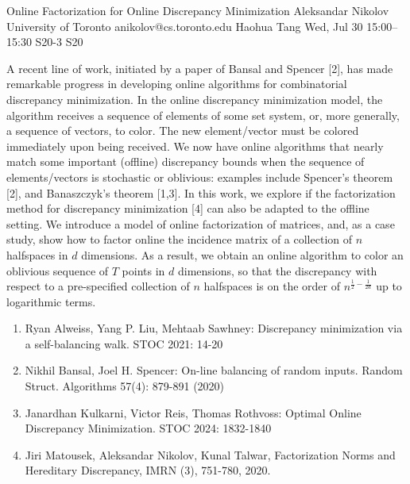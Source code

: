 \documentclass[12pt,lettersize,oneside]{book} %
\begin{document}
\begin{talk}
  {Online Factorization for Online Discrepancy Minimization}%
  {Aleksandar Nikolov}%
  {University of Toronto}%
  {anikolov@cs.toronto.edu}%
  {Haohua Tang}%
  {}%
  {Wed, Jul 30 15:00--15:30}%
  {S20-3}%
  {S20}%
  
    
   
A recent line of work, initiated by a paper of Bansal and Spencer [2], has made remarkable progress in developing online algorithms for combinatorial discrepancy minimization. In the online discrepancy minimization model, the algorithm receives a sequence of elements of some set system, or, more generally, a sequence of vectors, to color. The new element/vector must be colored immediately upon being received. We now have online algorithms that nearly match some important (offline) discrepancy bounds when the sequence of elements/vectors is stochastic or oblivious: examples include Spencer's theorem [2], and Banaszczyk's theorem [1,3]. In this work, we explore if the factorization method for discrepancy minimization [4] can also be adapted to the offline setting. We introduce a model of online factorization of matrices, and, as a case study, show how to factor online the incidence matrix of a collection of $n$ halfspaces in $d$ dimensions. As a result, we obtain an online algorithm to color an oblivious sequence of $T$ points in $d$ dimensions, so that the discrepancy with respect to a pre-specified collection of $n$ halfspaces is on the order of $n^{\frac12 - \frac{1}{2d}}$ up to logarithmic terms. 

\medskip

\begin{enumerate}
    \item[{[1]}] Ryan Alweiss, Yang P. Liu, Mehtaab Sawhney:
Discrepancy minimization via a self-balancing walk. STOC 2021: 14-20

 \item[{[2]}] Nikhil Bansal, Joel H. Spencer:
On-line balancing of random inputs. Random Struct. Algorithms 57(4): 879-891 (2020)

    \item[{[3]}] Janardhan Kulkarni, Victor Reis, Thomas Rothvoss:
Optimal Online Discrepancy Minimization. STOC 2024: 1832-1840

    \item[{[4]}] Jiri Matousek, Aleksandar Nikolov, Kunal Talwar, Factorization Norms and Hereditary Discrepancy, IMRN (3), 751-780, 2020. 

\end{enumerate}
\end{talk}
\end{document}

